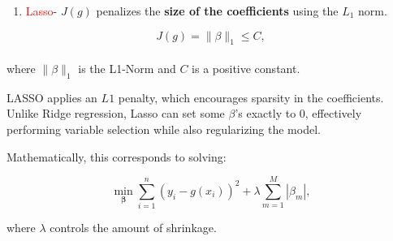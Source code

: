 \documentclass[
  letterpaper,
  DIV=11,
  numbers=noendperiod]{scrreprt}
\providecommand{\tightlist}{%
  \setlength{\itemsep}{0pt}\setlength{\parskip}{0pt}}\usepackage{longtable,booktabs,array}
\begin{document}
\begin{enumerate}
\def\labelenumi{\Roman{enumi}.}
\setcounter{enumi}{1}
\tightlist
\item
  \textcolor{red}{Lasso}- \(J(g)\) penalizes the \textbf{size of the
  coefficients} using the \(L_1\) norm.
\end{enumerate}

\[
J(g) = \|\beta\|_1 \leq C,
\]\\
where \(\|\beta\|_1\) is the L1-Norm and \(C\) is a positive constant.

LASSO applies an \(L1\) penalty, which encourages sparsity in the
coefficients.\\
Unlike Ridge regression, Lasso can set some \(\beta\)'s exactly to 0,
effectively performing variable selection while also regularizing the
model.

Mathematically, this corresponds to solving:

\[
\min_{\boldsymbol{\beta}} \sum_{i=1}^{n} (y_i - g(x_i))^2 + \lambda \sum_{m=1}^{M} |\beta_m|,
\]

where \(\lambda\) controls the amount of shrinkage.
\end{document}
